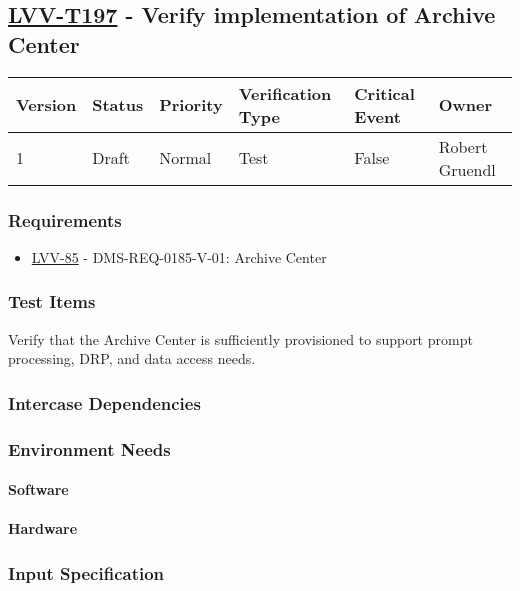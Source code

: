 \subsection{\href{https://jira.lsstcorp.org/secure/Tests.jspa\#/testCase/LVV-T197}{LVV-T197}
    - Verify implementation of Archive Center}\label{lvv-t197}

\begin{longtable}[]{llllll}
\toprule
Version & Status & Priority & Verification Type & Critical Event & Owner
\\\midrule
1 & Draft & Normal &
Test & False & Robert Gruendl
\\\bottomrule
\end{longtable}

\subsubsection{Requirements}
\begin{itemize}
\item \href{https://jira.lsstcorp.org/browse/LVV-85}{LVV-85} - DMS-REQ-0185-V-01: Archive Center
\end{itemize}

\subsubsection{Test Items}
Verify that the Archive Center is sufficiently provisioned to support
prompt processing, DRP, and data access needs.



\subsubsection{Intercase Dependencies}

\subsubsection{Environment Needs}

\paragraph{Software}

\paragraph{Hardware}

\subsubsection{Input Specification}

